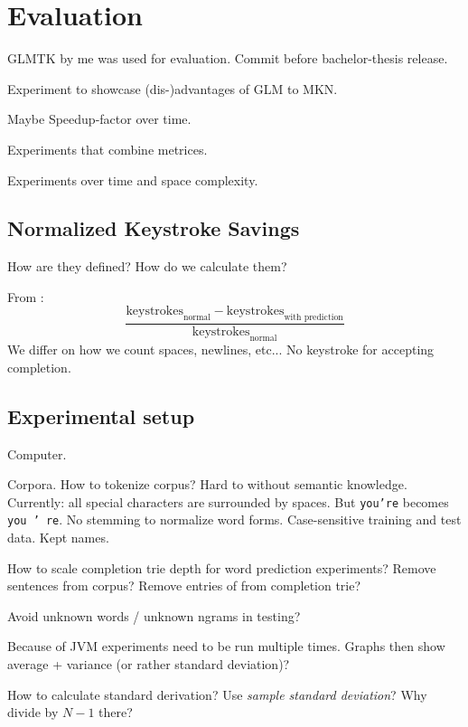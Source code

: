 \chapter{Evaluation}
\label{ch:evaluation}

\begin{draft}
GLMTK by me was used for evaluation.
Commit before bachelor-thesis release.

Experiment to showcase (dis-)advantages of GLM to MKN.

Maybe Speedup-factor over time.

Experiments that combine metrices.

Experiments over time and space complexity.
\end{draft}

\section{Normalized Keystroke Savings}

\begin{draft}
How are they defined?
How do we calculate them?

From \textcite{Trnka2011}:
\begin{equation}
  \frac{\text{keystrokes}_\text{normal} - \text{keystrokes}_\text{with prediction}}
       {\text{keystrokes}_\text{normal}}
\end{equation}
We differ on how we count spaces, newlines, etc...
No keystroke for accepting completion.

\end{draft}

\section{Experimental setup}

\begin{draft}
Computer.

Corpora.
\textcite{OANC}
How to tokenize corpus?
Hard to without semantic knowledge.
Currently: all special characters are surrounded by spaces.
But \texttt{you're} becomes \texttt{you ' re}.
No stemming to normalize word forms.
Case-sensitive training and test data.
Kept names.

How to scale completion trie depth for word prediction experiments?
Remove sentences from corpus?
Remove entries of from completion trie?

Avoid unknown words / unknown ngrams in testing?

Because of JVM experiments need to be run multiple times.
Graphs then show average + variance (or rather standard deviation)?

How to calculate standard derivation?
Use \emph{sample standard deviation}?
Why divide by $N-1$ there?
\end{draft}

